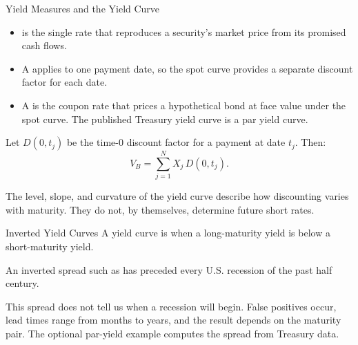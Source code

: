 \documentclass[aspectratio=169,11pt]{beamer}
\begin{document}
\begin{frame}{Yield Measures and the Yield Curve}
  \vspace{0.3em}
  \begin{itemize}\setlength{\itemsep}{0.45em}
    \item {} is the single rate that reproduces a
      security's market price from its promised cash flows.
    \item A  applies to one payment date, so the spot curve
      provides a separate discount factor for each date.
    \item A  is the coupon rate that prices a hypothetical bond
      at face value under the spot curve. The published Treasury yield curve is a
      par yield curve.
  \end{itemize}

  Let $D(0,t_j)$ be the time-0 discount factor for a payment at date $t_j$.
  Then:
  \[
    V_B=\sum_{j=1}^{N}X_j\,D(0,t_j).
  \]

  \vspace{0.2em}
  The level, slope, and curvature of the yield curve describe how discounting
  varies with maturity. They do not, by themselves, determine future short
  rates.
\end{frame}

\begin{frame}{Inverted Yield Curves}
  \vspace{0.4em}
  A yield curve is  when a long-maturity yield is below a
  short-maturity yield.

  \vspace{0.7em}
  An inverted spread such as  has preceded every
  U.S. recession of the past half century.

  \vspace{0.7em}
  This spread does not tell us when a recession will begin. False positives
  occur, lead times range from months to years, and the result depends on the
  maturity pair. The optional par-yield example computes the spread from
  Treasury data.

\end{frame}
\end{document}
